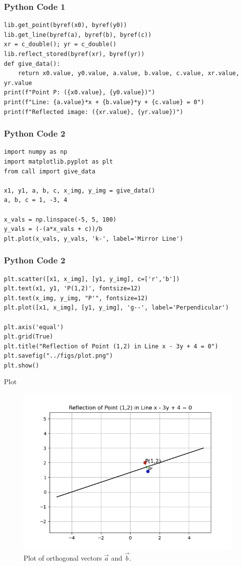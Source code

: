 \documentclass{beamer}
\begin{document}
\begin{frame}[fragile]
    \frametitle{Python Code 1}
    \begin{lstlisting}
lib.get_point(byref(x0), byref(y0))
lib.get_line(byref(a), byref(b), byref(c))
xr = c_double(); yr = c_double()
lib.reflect_stored(byref(xr), byref(yr))
def give_data():
    return x0.value, y0.value, a.value, b.value, c.value, xr.value, yr.value
print(f"Point P: ({x0.value}, {y0.value})")
print(f"Line: {a.value}*x + {b.value}*y + {c.value} = 0")
print(f"Reflected image: ({xr.value}, {yr.value})")
    \end{lstlisting}
\end{frame}

\begin{frame}[fragile]
    \frametitle{Python Code 2}
    \begin{lstlisting}
import numpy as np
import matplotlib.pyplot as plt
from call import give_data

x1, y1, a, b, c, x_img, y_img = give_data()
a, b, c = 1, -3, 4

x_vals = np.linspace(-5, 5, 100)
y_vals = (-(a*x_vals + c))/b
plt.plot(x_vals, y_vals, 'k-', label='Mirror Line')
    \end{lstlisting}
\end{frame}

\begin{frame}[fragile]
    \frametitle{Python Code 2}
    \begin{lstlisting}
plt.scatter([x1, x_img], [y1, y_img], c=['r','b'])
plt.text(x1, y1, 'P(1,2)', fontsize=12)
plt.text(x_img, y_img, "P'", fontsize=12)
plt.plot([x1, x_img], [y1, y_img], 'g--', label='Perpendicular')

plt.axis('equal')
plt.grid(True)
plt.title("Reflection of Point (1,2) in Line x - 3y + 4 = 0")
plt.savefig("../figs/plot.png")
plt.show()
    \end{lstlisting}
\end{frame}

\begin{frame}{Plot}
    \begin{figure}
        \centering
        \includegraphics[width=0.5\columnwidth]{../figs/plot.png}
        \caption{Plot of orthogonal vectors $\vec{a}$ and $\vec{b}$.}
        \label{fig:fig}
    \end{figure}
\end{frame}
\end{document}
